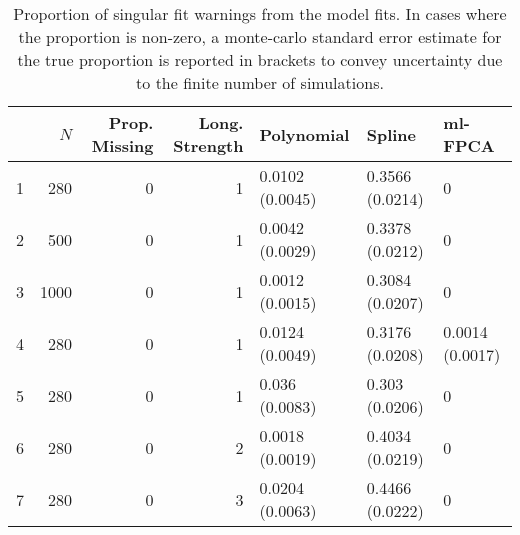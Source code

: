 \begin{table}[ht]
\centering
\begin{tabular}{lrrrlll}
  \toprule
 & {\bfseries $N$} & {\bfseries Prop. Missing} & {\bfseries Long. Strength} & {\bfseries Polynomial} & {\bfseries Spline} & {\bfseries ml-FPCA} \\ 
  \midrule
1 & 280 & 0 & 1 & 0.0102 (0.0045) & 0.3566 (0.0214) & 0 \\ 
  2 & 500 & 0 & 1 & 0.0042 (0.0029) & 0.3378 (0.0212) & 0 \\ 
  3 & 1000 & 0 & 1 & 0.0012 (0.0015) & 0.3084 (0.0207) & 0 \\ 
  4 & 280 & 0 & 1 & 0.0124 (0.0049) & 0.3176 (0.0208) & 0.0014 (0.0017) \\ 
  5 & 280 & 0 & 1 & 0.036 (0.0083) & 0.303 (0.0206) & 0 \\ 
  6 & 280 & 0 & 2 & 0.0018 (0.0019) & 0.4034 (0.0219) & 0 \\ 
  7 & 280 & 0 & 3 & 0.0204 (0.0063) & 0.4466 (0.0222) & 0 \\ 
   \bottomrule
\end{tabular}
\caption{Proportion of singular fit warnings from the model fits. In cases where the proportion is non-zero, a monte-carlo standard error estimate for the true proportion is reported in brackets to convey uncertainty due to the finite number of simulations.} 
\label{tab:singularity-table}
\end{table}
